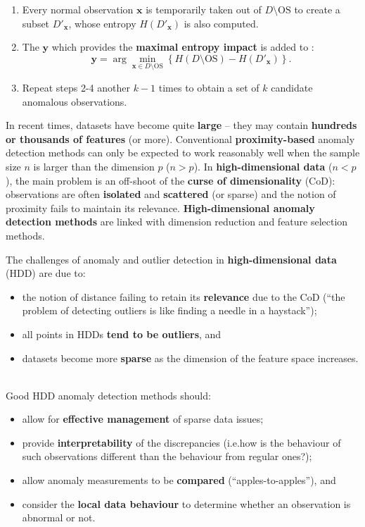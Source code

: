 \documentclass[20pt,landscape,footrule,headrule]{foils}
\newcommand{\newl}{\newline\newline}
\def\fh{\foilhead}
\begin{document}
{{\begin{enumerate}
\item Every normal observation $\mathbf{x}$ is temporarily taken out of $D\setminus \text{OS}$ to create a subset $D'_{\mathbf{x}}$, whose entropy $H(D'_{\mathbf{x}})$ is also computed.
\item The $\mathbf{y}$ which provides the \textbf{maximal entropy impact} is added to : $$\mathbf{y}=\arg\min_{\mathbf{x}\in D\setminus \text{OS}} \left\{H(D\setminus \text{OS})-H(D'_{\mathbf{x}})\right\}.$$
\item Repeat steps 2-4 another $k-1$ times to obtain a set  of $k$ candidate anomalous observations.
\end{enumerate}

\fh{\textcolor{darkestgreen}{6.4 -- Anomalies in High-Dimensional Datasets}} \label{6.4}
\noindent In recent times, datasets have become quite \textbf{large} -- they may contain \textbf{hundreds or thousands of features} (or more).
\newl Conventional \textbf{proximity-based} anomaly detection methods can only be expected to work reasonably well when the sample size $n$ is larger than the dimension $p$ ($n>p$). 
\newl
In \textbf{high-dimensional data} ($n<p$), the main problem is an off-shoot of the \textbf{curse of dimensionality} (CoD):  observations are often \textbf{isolated} and \textbf{scattered} (or sparse) and the notion of proximity fails to maintain its relevance. \newl \textbf{High-dimensional anomaly detection methods} are linked with dimension reduction and feature selection methods. 

\fh{6.4.1 -- Definitions and Challenges} \label{6.4.1}
\noindent The challenges of anomaly and outlier detection in \textbf{high-dimensional data} (HDD) are due to:
\begin{itemize}
\item the notion of distance failing to retain its \textbf{relevance} due to the CoD (``the problem of detecting outliers is like finding a needle in a haystack'');
\item all points in HDDs \textbf{tend to be  outliers}, and 
\item datasets become more \textbf{sparse} as the dimension of the feature space increases.
\end{itemize}

\newpage\ \\ \noindent Good HDD anomaly detection methods should:
\begin{itemize}
\item allow for \textbf{effective management} of sparse data issues;
\item provide \textbf{interpretability} of the discrepancies (i.e.\@ how is the behaviour of such observations different than the behaviour from regular ones?);
\item allow anomaly measurements to be \textbf{compared} (``apples-to-apples''), and 
\item consider the \textbf{local data behaviour} to determine whether an observation is abnormal or not.
\end{itemize}

}}
\end{document}
